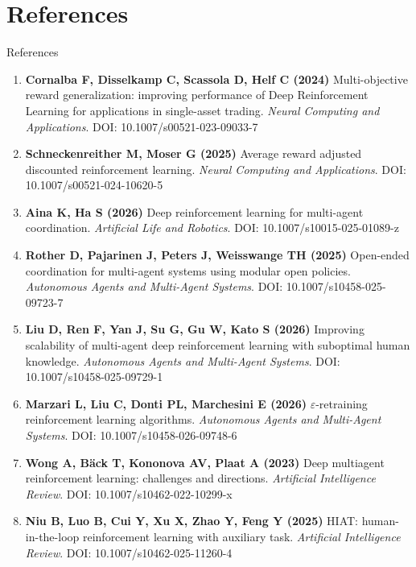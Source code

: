\documentclass[aspectratio=169,10pt]{beamer}
\begin{document}
\section{References}

\begin{frame}{References}
\scriptsize
{}
\begin{enumerate}\itemsep0.28em\leftskip=-0.55em
\item \textbf{Cornalba F, Disselkamp C, Scassola D, Helf C (2024)} Multi-objective reward generalization: improving performance of Deep Reinforcement Learning for applications in single-asset trading. \textit{Neural Computing and Applications}. DOI: 10.1007/s00521-023-09033-7
\item \textbf{Schneckenreither M, Moser G (2025)} Average reward adjusted discounted reinforcement learning. \textit{Neural Computing and Applications}. DOI: 10.1007/s00521-024-10620-5
\item \textbf{Aina K, Ha S (2026)} Deep reinforcement learning for multi-agent coordination. \textit{Artificial Life and Robotics}. DOI: 10.1007/s10015-025-01089-z
\item \textbf{Rother D, Pajarinen J, Peters J, Weisswange TH (2025)} Open-ended coordination for multi-agent systems using modular open policies. \textit{Autonomous Agents and Multi-Agent Systems}. DOI: 10.1007/s10458-025-09723-7
\item \textbf{Liu D, Ren F, Yan J, Su G, Gu W, Kato S (2026)} Improving scalability of multi-agent deep reinforcement learning with suboptimal human knowledge. \textit{Autonomous Agents and Multi-Agent Systems}. DOI: 10.1007/s10458-025-09729-1
\item \textbf{Marzari L, Liu C, Donti PL, Marchesini E (2026)} $\varepsilon$-retraining reinforcement learning algorithms. \textit{Autonomous Agents and Multi-Agent Systems}. DOI: 10.1007/s10458-026-09748-6
\item \textbf{Wong A, B\"ack T, Kononova AV, Plaat A (2023)} Deep multiagent reinforcement learning: challenges and directions. \textit{Artificial Intelligence Review}. DOI: 10.1007/s10462-022-10299-x
\item \textbf{Niu B, Luo B, Cui Y, Xu X, Zhao Y, Feng Y (2025)} HIAT: human-in-the-loop reinforcement learning with auxiliary task. \textit{Artificial Intelligence Review}. DOI: 10.1007/s10462-025-11260-4
\end{enumerate}
\end{frame}
\end{document}
